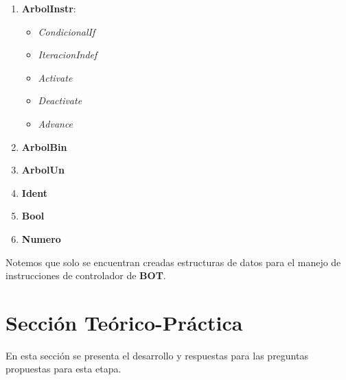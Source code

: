 \documentclass[a4paper, 10pt]{article}
\begin{document}
			\begin{enumerate}
				\item \textbf{ArbolInstr}:
				\begin{itemize}
					\item \textit{CondicionalIf}
					\item \textit{IteracionIndef}
					\item \textit{Activate}
					\item \textit{Deactivate}
					\item \textit{Advance}					
				\end{itemize}							
				\item \textbf{ArbolBin}
				\item \textbf{ArbolUn}
				\item \textbf{Ident}
				\item \textbf{Bool}
				\item \textbf{Numero}\\
			\end{enumerate}
			
			Notemos que solo se encuentran creadas estructuras de datos para el manejo de instrucciones de
			controlador de \textbf{BOT}.
	
	\newpage			
	\section{Sección Teórico-Práctica}
		
		\par
		\medskip
		En esta sección se presenta el desarrollo y respuestas para las preguntas propuestas para esta 
		etapa.\\
		
\end{document}
